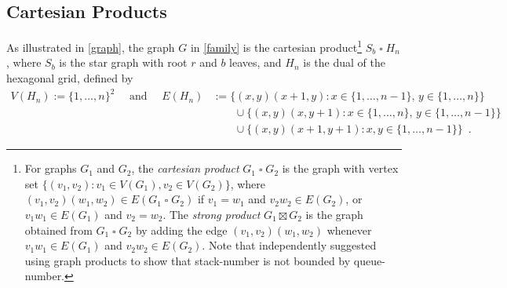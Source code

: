 \documentclass[kpfonts]{patmorin}
\newcommand{\CartProd}{\mathbin{\square}}
\begin{document}
\subsection*{Cartesian Products}

As illustrated in \cref{graph}, the graph $G$ in \cref{family} is the cartesian product\footnote{For graphs $G_1$ and $G_2$, the \emph{cartesian product} $G_1\CartProd G_2$ is the graph with vertex set $\{(v_1,v_2): v_1 \in V(G_1), v_2 \in V(G_2)\}$, where $(v_1,v_2)(w_1,w_2)\in E(G_1\CartProd G_2)$ if $v_1=w_1$ and $v_2w_2\in E(G_2)$, or $v_1w_1\in E(G_1)$ and $v_2=w_2$. The \emph{strong product} $G_1\boxtimes G_2$ is the graph obtained from $G_1\CartProd G_2$ by adding the edge $(v_1,v_2)(w_1,w_2)$ whenever $v_1w_1\in E(G_1)$ and $v_2w_2\in E(G_2)$. Note that \citet{Pupyrev20} independently suggested using graph products to show that stack-number is not bounded by queue-number.} $S_b\CartProd H_n$, where $S_b$ is the star graph with root $r$ and $b$ leaves, and $H_n$ is the dual of the hexagonal grid, defined by
\begin{align*}
V(H_n)  :=\{1,\ldots,n\}^2 \quad \text{ and } \quad
E(H_n) & :=  \{(x,y)(x+1,y):x\in\{1,\ldots,n-1\},\,y\in\{1,\ldots,n\}\} \\
& \qquad \cup \{(x,y)(x,y+1):x\in\{1,\ldots,n\},\,y\in\{1,\ldots,n-1\}\} \\
& \qquad \cup \{(x,y)(x+1,y+1):x,y\in\{1,\ldots,n-1\}\} \enspace .
\end{align*}
\end{document}
